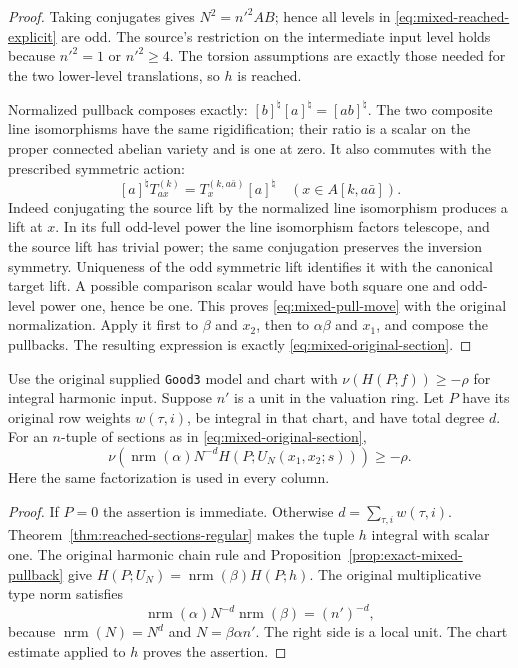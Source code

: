 \begin{proof}
Taking conjugates gives $N^2=n'^2AB$; hence all levels in
\eqref{eq:mixed-reached-explicit} are odd.  The source's restriction on
the intermediate input level holds because $n'^2=1$ or $n'^2\geq4$.
The torsion assumptions are exactly those needed for the two lower-level
translations, so $h$ is reached.

Normalized pullback composes exactly:
$[b]^\natural[a]^\natural=[ab]^\natural$.  The two composite line
isomorphisms have the same rigidification; their ratio is a scalar on
the proper connected abelian variety and is one at zero.  It also
commutes with the prescribed symmetric action:
\begin{equation}\label{eq:mixed-pull-move}
 [a]^\natural T_{ax}^{(k)}=T_x^{(k,a\bar a)}[a]^\natural
                  \quad(x\in A[k,a\bar a]).
\end{equation}
Indeed conjugating the source lift by the normalized line isomorphism
produces a lift at $x$.  In its full odd-level power the line
isomorphism factors telescope, and the source lift has trivial power;
the same conjugation preserves the inversion symmetry.  Uniqueness
of the odd symmetric lift identifies it with the canonical target
lift.  A possible comparison scalar would have both square one and
odd-level power one, hence be one.  This proves
\eqref{eq:mixed-pull-move} with the original normalization.
Apply it first to $\beta$ and $x_2$, then to $\alpha\beta$ and $x_1$,
and compose the pullbacks.  The resulting expression is exactly
\eqref{eq:mixed-original-section}.
\end{proof}

\begin{corollary}
\label{cor:mixed-harmonic-term}
Use the original supplied \texttt{Good3} model and chart with
$\nu(H(P;f))\geq-\rho$ for integral harmonic input.  Suppose $n'$ is
a unit in the valuation ring.  Let $P$ have its original row weights
$w(\tau,i)$, be integral in that chart, and have total degree $d$.
For an $n$-tuple of sections as in
\eqref{eq:mixed-original-section},
\[
 \nu\!\left(\operatorname{nrm}(\alpha)N^{-d}
               H(P;U_N(x_1,x_2;s))\right)\geq-\rho.
\]
Here the same factorization is used in every column.
\end{corollary}
\begin{proof}
If $P=0$ the assertion is immediate.  Otherwise
$d=\sum_{\tau,i}w(\tau,i)$.
Theorem~\ref{thm:reached-sections-regular} makes the tuple $h$ integral
with scalar one.  The original harmonic chain rule and
Proposition~\ref{prop:exact-mixed-pullback} give
$H(P;U_N)=\operatorname{nrm}(\beta)H(P;h)$.
The original multiplicative type norm satisfies
\[
 \operatorname{nrm}(\alpha)N^{-d}\operatorname{nrm}(\beta)
          =(n')^{-d},
\]
because $\operatorname{nrm}(N)=N^d$ and
$N=\beta\alpha n'$.  The right side is a local unit.
The chart estimate applied to $h$ proves the assertion.
\end{proof}

